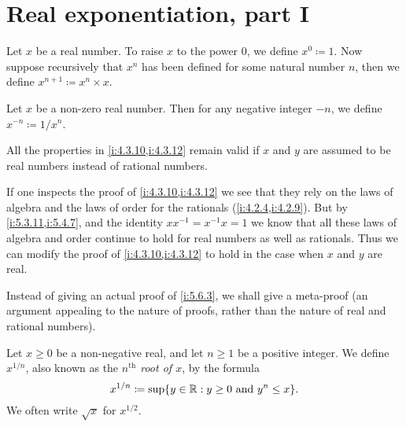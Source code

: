 \section{Real exponentiation, part I}\label{i:sec:5.6}

\begin{defn}\label{i:5.6.1}
  Let \(x\) be a real number.
  To raise \(x\) to the power \(0\), we define \(x^0 \coloneqq 1\).
  Now suppose recursively that \(x^n\) has been defined for some natural number \(n\), then we define \(x^{n + 1} \coloneqq x^n \times x\).
\end{defn}

\begin{defn}\label{i:5.6.2}
  Let \(x\) be a non-zero real number.
  Then for any negative integer \(-n\), we define \(x^{-n} \coloneqq 1 / x^n\).
\end{defn}

\begin{prop}\label{i:5.6.3}
  All the properties in \cref{i:4.3.10,i:4.3.12} remain valid if \(x\) and \(y\) are assumed to be real numbers instead of rational numbers.
\end{prop}

\begin{meta-proof}
If one inspects the proof of \cref{i:4.3.10,i:4.3.12} we see that they rely on the laws of algebra and the laws of order for the rationals (\cref{i:4.2.4,i:4.2.9}).
But by \cref{i:5.3.11,i:5.4.7}, and the identity \(xx^{-1} = x^{-1} x = 1\) we know that all these laws of algebra and order continue to hold for real numbers as well as rationals.
Thus we can modify the proof of \cref{i:4.3.10,i:4.3.12} to hold in the case when \(x\) and \(y\) are real.
\end{meta-proof}

\begin{note}
  Instead of giving an actual proof of \cref{i:5.6.3}, we shall give a meta-proof
  (an argument appealing to the nature of proofs, rather than the nature of real and rational numbers).
\end{note}

\begin{defn}\label{i:5.6.4}
  Let \(x \geq 0\) be a non-negative real, and let \(n \geq 1\) be a positive integer.
  We define \(x^{1 / n}\), also known as the \emph{\(n^{\text{th}}\) root of \(x\)}, by the formula
  \[
    x^{1 / n} \coloneqq \sup\set{y \in \R : y \geq 0 \text{ and } y^n \leq x}.
  \]
  We often write \(\sqrt{x}\) for \(x^{1 / 2}\).
\end{defn}

